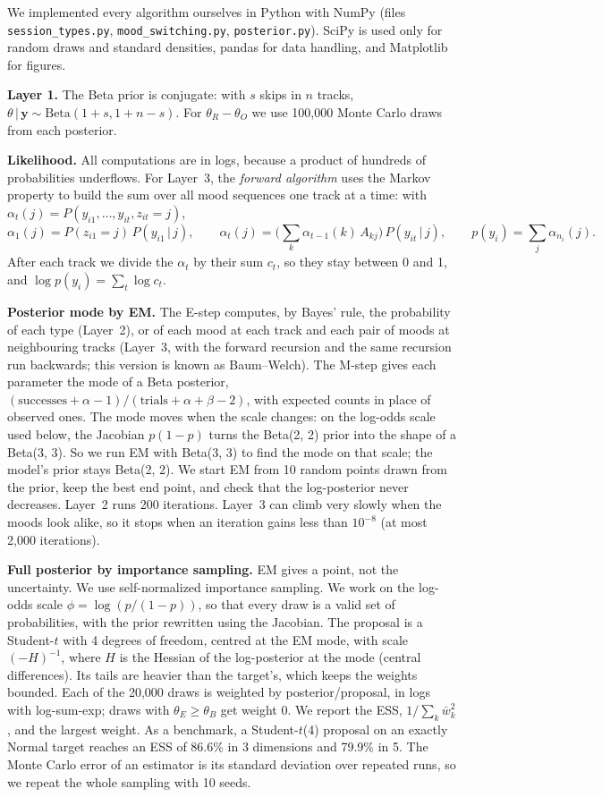 \documentclass[12pt]{article}
\newcommand{\by}{\mathbf{y}}
\newcommand{\given}{\,\vert\,}
\begin{document}
We implemented every algorithm ourselves in Python with NumPy (files \texttt{session\_types.py}, \texttt{mood\_switching.py}, \texttt{posterior.py}). SciPy is used only for random draws and standard densities, pandas for data handling, and Matplotlib for figures.

\textbf{Layer 1.} The Beta prior is conjugate: with $s$ skips in $n$ tracks, $\theta \given \by \sim \text{Beta}(1+s, 1+n-s)$. For $\theta_R - \theta_O$ we use 100{,}000 Monte Carlo draws from each posterior.

\textbf{Likelihood.} All computations are in logs, because a product of hundreds of probabilities underflows. For Layer~3, the \emph{forward algorithm} uses the Markov property to build the sum over all mood sequences one track at a time: with $\alpha_t(j) = P(y_{i1}, \dots, y_{it}, z_{it} = j)$,
\[
\alpha_1(j) = P(z_{i1}=j)\,P(y_{i1}\given j), \qquad
\alpha_t(j) = \Big(\textstyle\sum_k \alpha_{t-1}(k)\, A_{kj}\Big)\, P(y_{it} \given j), \qquad
p(y_i) = \textstyle\sum_j \alpha_{n_i}(j).
\]
After each track we divide the $\alpha_t$ by their sum $c_t$, so they stay between 0 and 1, and $\log p(y_i) = \sum_t \log c_t$.

\textbf{Posterior mode by EM.} The E-step computes, by Bayes' rule, the probability of each type (Layer~2), or of each mood at each track and each pair of moods at neighbouring tracks (Layer~3, with the forward recursion and the same recursion run backwards; this version is known as Baum--Welch). The M-step gives each parameter the mode of a Beta posterior, $(\text{successes} + \alpha - 1)/(\text{trials} + \alpha + \beta - 2)$, with expected counts in place of observed ones. The mode moves when the scale changes: on the log-odds scale used below, the Jacobian $p(1-p)$ turns the Beta(2, 2) prior into the shape of a Beta(3, 3). So we run EM with Beta(3, 3) to find the mode on that scale; the model's prior stays Beta(2, 2). We start EM from 10 random points drawn from the prior, keep the best end point, and check that the log-posterior never decreases. Layer~2 runs 200 iterations. Layer~3 can climb very slowly when the moods look alike, so it stops when an iteration gains less than $10^{-8}$ (at most 2{,}000 iterations).

\textbf{Full posterior by importance sampling.} EM gives a point, not the uncertainty. We use self-normalized importance sampling. We work on the log-odds scale $\phi = \log(p/(1-p))$, so that every draw is a valid set of probabilities, with the prior rewritten using the Jacobian. The proposal is a Student-$t$ with 4 degrees of freedom, centred at the EM mode, with scale $(-H)^{-1}$, where $H$ is the Hessian of the log-posterior at the mode (central differences). Its tails are heavier than the target's, which keeps the weights bounded. Each of the 20{,}000 draws is weighted by posterior/proposal, in logs with log-sum-exp; draws with $\theta_E \ge \theta_B$ get weight 0. We report the ESS, $1/\sum_k \bar w_k^2$, and the largest weight. As a benchmark, a Student-$t$(4) proposal on an exactly Normal target reaches an ESS of 86.6\% in 3 dimensions and 79.9\% in 5. The Monte Carlo error of an estimator is its standard deviation over repeated runs, so we repeat the whole sampling with 10 seeds.
\end{document}
